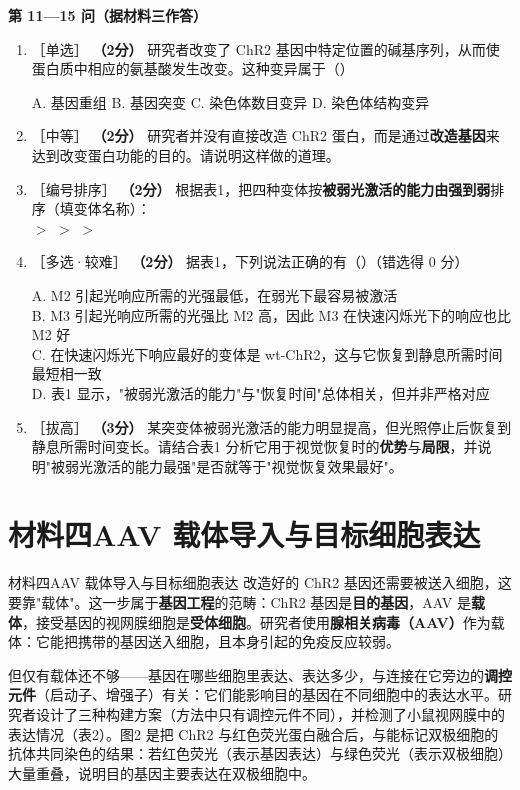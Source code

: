 \documentclass[UTF8,a4paper,11pt]{ctexart}
\newcommand{\pt}[1]{\textbf{（#1分）}}
\newcommand{\lv}[1]{{\small\color{deepgreen}［#1］}}
\newcommand{\tian}[1]{\underline{\hspace{#1}}}
\newcommand{\choice}[1]{\par\smallskip\noindent #1\par}
\begin{document}
\begin{qbox}
\noindent\textbf{\color{deepgreen}第 11—15 问（据材料三作答）}
\begin{enumerate}[leftmargin=2.2em,itemsep=5pt,start=11]
\item \lv{单选} \pt{2} 研究者改变了 ChR2 基因中特定位置的碱基序列，从而使蛋白质中相应的氨基酸发生改变。这种变异属于（\quad）
\choice{A. 基因重组 \quad B. 基因突变 \quad C. 染色体数目变异 \quad D. 染色体结构变异}

\item \lv{中等} \pt{2} 研究者并没有直接改造 ChR2 蛋白，而是通过\textbf{改造基因}来达到改变蛋白功能的目的。请说明这样做的道理。\tian{0.48\textwidth}

\item \lv{编号排序} \pt{2} 根据表1，把四种变体按\textbf{被弱光激活的能力由强到弱}排序（填变体名称）：\\
\tian{2.4cm} $>$ \tian{2.4cm} $>$ \tian{2.4cm} $>$ \tian{2.4cm}

\item \lv{多选·较难} \pt{2} 据表1，下列说法正确的有（\quad）（错选得 0 分）
\choice{A. M2 引起光响应所需的光强最低，在弱光下最容易被激活\\
B. M3 引起光响应所需的光强比 M2 高，因此 M3 在快速闪烁光下的响应也比 M2 好\\
C. 在快速闪烁光下响应最好的变体是 wt-ChR2，这与它恢复到静息所需时间最短相一致\\
D. 表1 显示，"被弱光激活的能力"与"恢复时间"总体相关，但并非严格对应}

\item \lv{拔高} \pt{3} 某突变体被弱光激活的能力明显提高，但光照停止后恢复到静息所需时间变长。请结合表1 分析它用于视觉恢复时的\textbf{优势}与\textbf{局限}，并说明"被弱光激活的能力最强"是否就等于"视觉恢复效果最好"。
\end{enumerate}
\end{qbox}

\section{材料四\quad AAV 载体导入与目标细胞表达}

\begin{matbox}{材料四\quad AAV 载体导入与目标细胞表达}
改造好的 ChR2 基因还需要被送入细胞，这要靠"载体"。这一步属于\textbf{基因工程}的范畴：ChR2 基因是\textbf{目的基因}，AAV 是\textbf{载体}，接受基因的视网膜细胞是\textbf{受体细胞}。研究者使用\textbf{腺相关病毒（AAV）}作为载体：它能把携带的基因送入细胞，且本身引起的免疫反应较弱。

但仅有载体还不够——基因在哪些细胞里表达、表达多少，与连接在它旁边的\textbf{调控元件}（启动子、增强子）有关：它们能影响目的基因在不同细胞中的表达水平。研究者设计了三种构建方案（方法中只有调控元件不同），并检测了小鼠视网膜中的表达情况（表2）。图2 是把 ChR2 与红色荧光蛋白融合后，与能标记双极细胞的抗体共同染色的结果：若红色荧光（表示基因表达）与绿色荧光（表示双极细胞）大量重叠，说明目的基因主要表达在双极细胞中。
\end{matbox}
\end{document}
